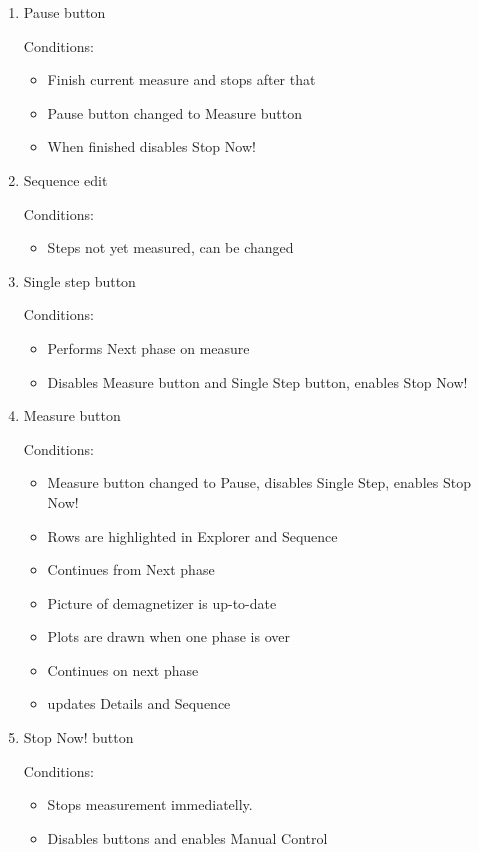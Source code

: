 \begin{enumerate}
\item Pause button

Conditions:
\begin{itemize}
\item Finish current measure and stops after that
\item Pause button changed to Measure button
\item When finished disables Stop Now!
\end{itemize}

\item Sequence edit

Conditions:
\begin{itemize}
\item Steps not yet measured, can be changed
\end{itemize}

\item Single step button

Conditions:
\begin{itemize}
\item Performs Next phase on measure
\item Disables Measure button and Single Step button, enables Stop Now!
\end{itemize}

\item Measure button

Conditions:
\begin{itemize}
\item Measure button changed to Pause, disables Single Step, enables Stop Now!
\item Rows are highlighted in Explorer and Sequence
\item Continues from Next phase
\item Picture of demagnetizer is up-to-date
\item Plots are drawn when one phase is over
\item Continues on next phase
\item updates Details and Sequence
\end{itemize}

\item Stop Now! button

Conditions:
\begin{itemize}
\item Stops measurement immediatelly.
\item Disables buttons and enables Manual Control
\end{itemize}

\end{enumerate}